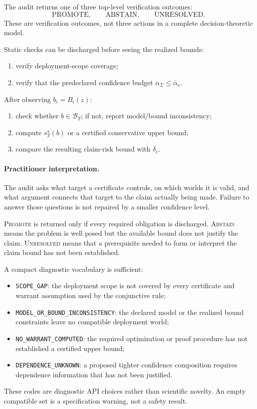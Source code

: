 \documentclass[10pt]{article}
\newcommand{\BT}{\mathcal B_T}
\begin{document}
The audit returns one of three top-level verification outcomes:
\[
\mathrm{PROMOTE},\qquad
\mathrm{ABSTAIN},\qquad
\mathrm{UNRESOLVED}.
\]
These are verification outcomes, not three actions in a complete
decision-theoretic model.

Static checks can be discharged before seeing the realized bounds:
\begin{enumerate}[label=(\arabic*)]
\item verify deployment-scope coverage;
\item verify that the predeclared confidence budget
\(\alpha_\Sigma\le\bar\alpha_c\).
\end{enumerate}
After observing \(b_i=B_i(z)\):
\begin{enumerate}[label=(\arabic*),resume]
\item check whether \(b\in\BT\); if not, report model/bound inconsistency;
\item compute \(s_T^\star(b)\) or a certified conservative upper bound;
\item compare the resulting claim-risk bound with \(\delta_c\).
\end{enumerate}

\paragraph{Practitioner interpretation.}
The audit asks what target a certificate controls, on which worlds it is valid,
and what argument connects that target to the claim actually being made.
Failure to answer those questions is not repaired by a smaller confidence
level.

\textsc{Promote} is returned only if every required obligation is discharged.
\textsc{Abstain} means the problem is well posed but the available bound does
not justify the claim.  \textsc{Unresolved} means that a prerequisite needed
to form or interpret the claim bound has not been established.

A compact diagnostic vocabulary is sufficient:
\begin{itemize}
\item \texttt{SCOPE\_GAP}: the deployment scope is not covered by every
certificate and warrant assumption used by the conjunctive rule;
\item \texttt{MODEL\_OR\_BOUND\_INCONSISTENCY}: the declared model or the
realized bound constraints leave no compatible deployment world;
\item \texttt{NO\_WARRANT\_COMPUTED}: the required optimization or proof
procedure has not established a certified upper bound;
\item \texttt{DEPENDENCE\_UNKNOWN}: a proposed tighter confidence
composition requires dependence information that has not been justified.
\end{itemize}
These codes are diagnostic API choices rather than scientific novelty.
An empty compatible set is a specification warning, not a safety result.
\end{document}
